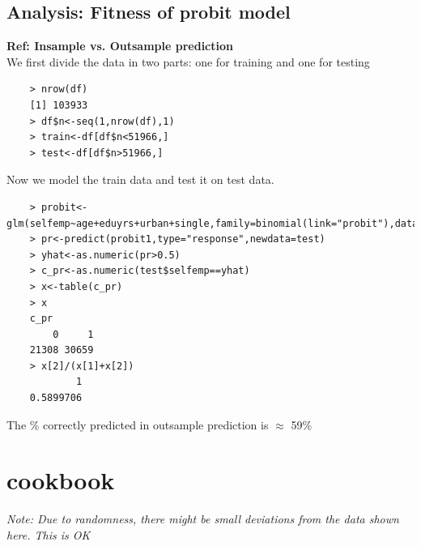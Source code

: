 \documentclass[notoc]{tufte-book}
\begin{document}
\section{Analysis: Fitness of probit model}
\textbf{Ref: Insample vs. Outsample prediction}\\
We first divide the data in two parts: one for training and one for testing
\begin{lstlisting}
    > nrow(df)
    [1] 103933
    > df$n<-seq(1,nrow(df),1)
    > train<-df[df$n<51966,]
    > test<-df[df$n>51966,]
\end{lstlisting}
Now we model the train data and test it on test data.
\begin{lstlisting}
    > probit<-glm(selfemp~age+eduyrs+urban+single,family=binomial(link="probit"),data=train)
    > pr<-predict(probit1,type="response",newdata=test)
    > yhat<-as.numeric(pr>0.5)
    > c_pr<-as.numeric(test$selfemp==yhat)
    > x<-table(c_pr)
    > x
    c_pr
        0     1 
    21308 30659 
    > x[2]/(x[1]+x[2])
            1 
    0.5899706 
\end{lstlisting}
The \% correctly predicted in outsample prediction is $\approx$ 59\%















\chapter{ cookbook}
\textit{Note: Due to randomness, there might be small deviations from the data shown here. This is OK}
\end{document}
